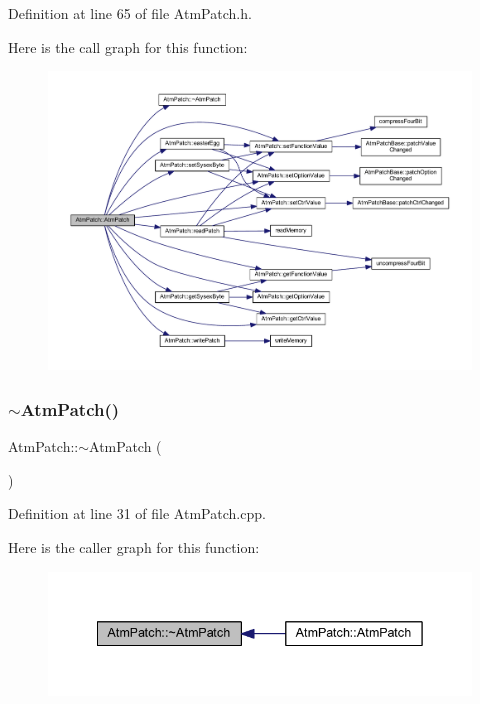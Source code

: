Definition at line 65 of file Atm\+Patch.\+h.

Here is the call graph for this function\+:
\nopagebreak
\begin{figure}[H]
\begin{center}
\leavevmode
\includegraphics[width=350pt]{class_atm_patch_ac9d24dbe3f01ee12145649819017f697_cgraph}
\end{center}
\end{figure}
\mbox{\label{class_atm_patch_ae37c93d358677907afbcc74c34469ba2}} 
\subsubsection{\texorpdfstring{$\sim$\+Atm\+Patch()}{~AtmPatch()}}
{\footnotesize\ttfamily Atm\+Patch\+::$\sim$\+Atm\+Patch (\begin{DoxyParamCaption}{ }\end{DoxyParamCaption})}



Definition at line 31 of file Atm\+Patch.\+cpp.

Here is the caller graph for this function\+:
\nopagebreak
\begin{figure}[H]
\begin{center}
\leavevmode
\includegraphics[width=342pt]{class_atm_patch_ae37c93d358677907afbcc74c34469ba2_icgraph}
\end{center}
\end{figure}


